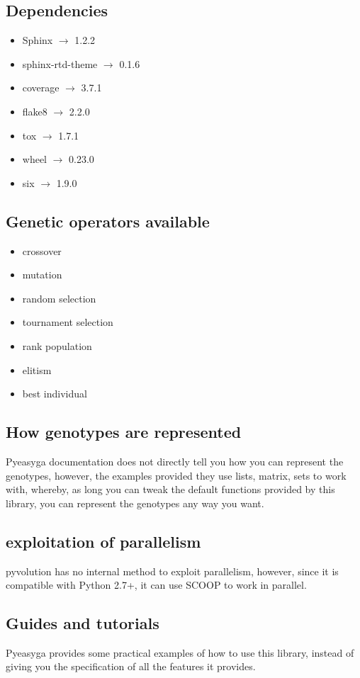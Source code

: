 \documentclass{article}
\begin{document}
\subsection{Dependencies}
\begin{itemize}
    \item Sphinx $\rightarrow$ 1.2.2
    \item sphinx-rtd-theme $\rightarrow$ 0.1.6
    \item coverage $\rightarrow$ 3.7.1
    \item flake8 $\rightarrow$ 2.2.0
    \item tox $\rightarrow$ 1.7.1
    \item wheel $\rightarrow$ 0.23.0
    \item six $\rightarrow$ 1.9.0
\end{itemize}
\subsection{Genetic operators available}
\begin{itemize}
    \item crossover
    \item mutation
    \item random selection
    \item tournament selection
    \item rank population
    \item elitism
    \item best individual
\end{itemize}
\subsection{How genotypes are represented}
Pyeasyga documentation does not directly tell you how you can represent the genotypes, however,  the examples provided they use lists, matrix, sets to work with, whereby, as long you can tweak the default functions provided by this library, you can represent the genotypes any way you want.
\subsection{exploitation of parallelism}
pyvolution has no internal method to exploit parallelism, however, since it is compatible with Python 2.7+, it can use SCOOP to work in parallel.
\subsection{Guides and tutorials}
Pyeasyga provides some practical examples of how to use this library, instead of giving you the specification of all the features it provides. 
\end{document}
